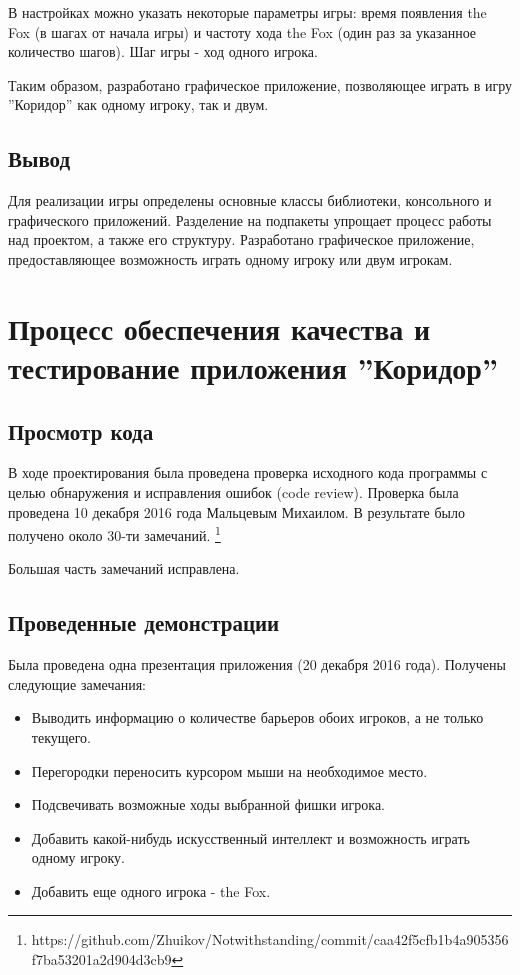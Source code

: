 \documentclass[a4paper]{article}
\begin{document}
В настройках можно указать некоторые параметры игры: время появления the Fox (в шагах от начала игры) и частоту хода the Fox (один раз за указанное количество шагов). Шаг игры - ход одного игрока.

Таким образом, разработано графическое приложение, позволяющее играть в игру ''Коридор'' как одному игроку, так и двум.  

\subsection{Вывод}
Для реализации игры определены основные классы библиотеки, консольного и графического приложений. Разделение на подпакеты упрощает процесс работы над проектом, а также его структуру. Разработано графическое приложение, предоставляющее возможность играть одному игроку или двум игрокам.

\section{Процесс обеспечения качества и тестирование приложения ''Коридор''}
\subsection{Просмотр кода}
В ходе проектирования была проведена проверка исходного кода программы с целью обнаружения и исправления ошибок (code review). Проверка была проведена 10 декабря 2016 года Мальцевым Михаилом. В результате было получено около 30-ти замечаний. \footnote{https://github.com/Zhuikov/Notwithstanding/commit/caa42f5cfb1b4a905356f7ba53201a2d904d3cb9}

Большая часть замечаний исправлена. 

\subsection{Проведенные демонстрации}
Была проведена одна презентация приложения (20 декабря 2016 года). Получены следующие замечания:
\begin{itemize}
\item Выводить информацию о количестве барьеров обоих игроков, а не только текущего.
\item Перегородки переносить курсором мыши на необходимое место.
\item Подсвечивать возможные ходы выбранной фишки игрока.
\item Добавить какой-нибудь искусственный интеллект и возможность играть одному игроку. 
\item Добавить еще одного игрока - the Fox.
\end{itemize}
\end{document}
